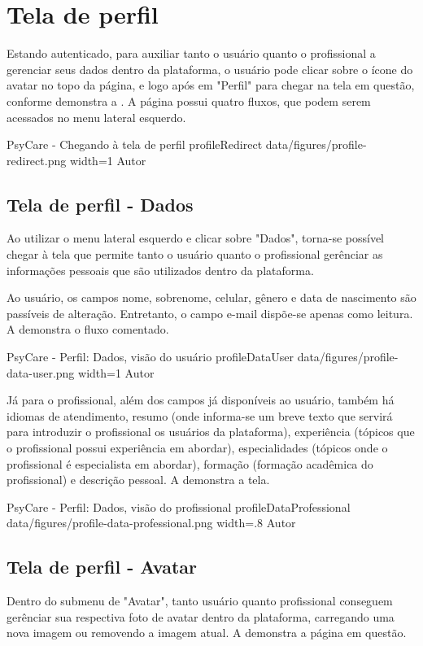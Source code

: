\section{Tela de perfil}
\label{sec:perfil}

Estando autenticado, para auxiliar tanto o usuário quanto o profissional a gerenciar seus dados dentro da plataforma, o usuário pode clicar sobre o ícone do avatar no topo da página, e logo após em "Perfil" para chegar na tela em questão, conforme demonstra a . A página possui quatro fluxos, que podem serem acessados no menu lateral esquerdo.

\image
    {PsyCare - Chegando à tela de perfil}
    {profileRedirect}
    {data/figures/profile-redirect.png}
    {width=1\textwidth}
    {Autor}


\subsection{Tela de perfil - Dados}
\label{sec:perfilDados}
Ao utilizar o menu lateral esquerdo e clicar sobre "Dados", torna-se possível chegar à tela que permite tanto o usuário quanto o profissional gerênciar as informações pessoais que são utilizados dentro da plataforma.

Ao usuário, os campos nome, sobrenome, celular, gênero e data de nascimento são passíveis de alteração. Entretanto, o campo e-mail dispõe-se apenas como leitura. A  demonstra o fluxo comentado.

\image
    {PsyCare - Perfil: Dados, visão do usuário}
    {profileDataUser}
    {data/figures/profile-data-user.png}
    {width=1\textwidth}
    {Autor}

Já para o profissional, além dos campos já disponíveis ao usuário, também há idiomas de atendimento, resumo (onde informa-se um breve texto que servirá para introduzir o profissional os usuários da plataforma), experiência (tópicos que o profissional possui experiência em abordar), especialidades (tópicos onde o profissional é especialista em abordar), formação (formação acadêmica do profissional) e descrição pessoal. A  demonstra a tela.

\image
    {PsyCare - Perfil: Dados, visão do profissional}
    {profileDataProfessional}
    {data/figures/profile-data-professional.png}
    {width=.8\textwidth}
    {Autor}

\subsection{Tela de perfil - Avatar}
\label{sec:perfilAvatar}
Dentro do submenu de "Avatar", tanto usuário quanto profissional conseguem gerênciar sua respectiva foto de avatar dentro da plataforma, carregando uma nova imagem ou removendo a imagem atual. A  demonstra a página em questão.

